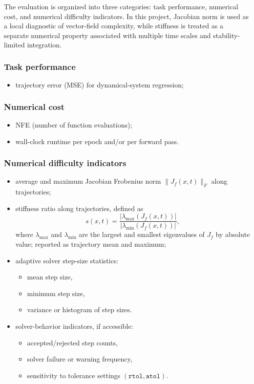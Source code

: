 \documentclass[11pt]{article}
\begin{document}
The evaluation is organized into three categories: task performance, numerical cost, and numerical difficulty indicators. In this project, Jacobian norm is used as a local diagnostic of vector-field complexity, while stiffness is treated as a separate numerical property associated with multiple time scales and stability-limited integration.

\subsubsection{Task performance}
\begin{itemize}[leftmargin=2em]
    \item trajectory error (MSE) for dynamical-system regression;
\end{itemize}

\subsubsection{Numerical cost}
\begin{itemize}[leftmargin=2em]
    \item NFE (number of function evaluations);
    \item wall-clock runtime per epoch and/or per forward pass.
\end{itemize}

\subsubsection{Numerical difficulty indicators}
\begin{itemize}[leftmargin=2em]
    \item average and maximum Jacobian Frobenius norm $\|J_f(x,t)\|_F$ along trajectories;
    \item stiffness ratio along trajectories, defined as
    \begin{equation}
        s(x,t) = \frac{|\lambda_{\max}(J_f(x,t))|}{|\lambda_{\min}(J_f(x,t))|},
    \end{equation}
    where $\lambda_{\max}$ and $\lambda_{\min}$ are the largest and smallest eigenvalues of $J_f$ by absolute value; reported as trajectory mean and maximum;
    \item adaptive solver step-size statistics:
    \begin{itemize}
        \item mean step size,
        \item minimum step size,
        \item variance or histogram of step sizes.
    \end{itemize}
    \item solver-behavior indicators, if accessible:
    \begin{itemize}
        \item accepted/rejected step counts,
        \item solver failure or warning frequency,
        \item sensitivity to tolerance settings $(\texttt{rtol}, \texttt{atol})$.
    \end{itemize}
\end{itemize}
\end{document}
